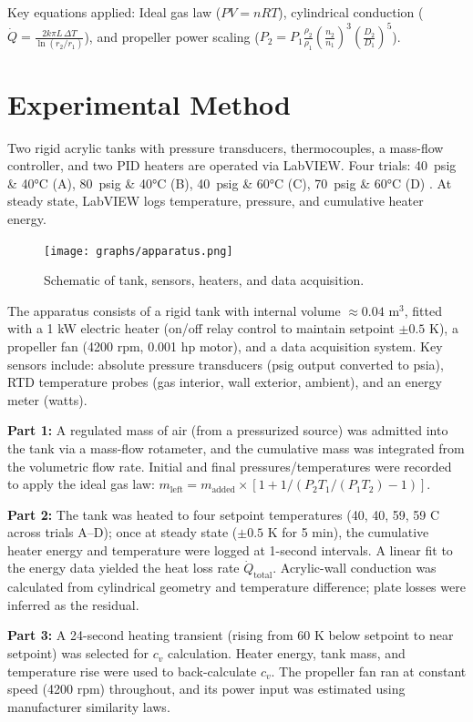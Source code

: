 \documentclass[12pt]{article}
\begin{document}
Key equations applied: Ideal gas law ($PV=nRT$), cylindrical conduction ($\dot{Q}=\frac{2k\pi L\,\Delta T}{\ln(r_2/r_1)}$), and propeller power scaling ($P_2 = P_1 \frac{\rho_2}{\rho_1} \left(\frac{n_2}{n_1}\right)^3 \left(\frac{D_2}{D_1}\right)^5$).

\section*{Experimental Method}
Two rigid acrylic tanks with pressure transducers, thermocouples, a mass-flow controller, and two PID heaters are operated via LabVIEW. Four trials: 40~psig \& 40\si{\celsius} (A), 80~psig \& 40\si{\celsius} (B), 40~psig \& 60\si{\celsius} (C), 70~psig \& 60\si{\celsius} (D) \cite{che260_manual}. At steady state, LabVIEW logs temperature, pressure, and cumulative heater energy.

\begin{figure}[H]
    \centering
    \texttt{[image: graphs/apparatus.png]}
    \caption{Schematic of tank, sensors, heaters, and data acquisition.}
    \label{fig:apparatus}
\end{figure}

The apparatus consists of a rigid tank with internal volume $\approx 0.04$ m$^3$, fitted with a 1 kW electric heater (on/off relay control to maintain setpoint $\pm 0.5$ K), a propeller fan (4200 rpm, 0.001 hp motor), and a data acquisition system. Key sensors include: absolute pressure transducers (psig output converted to psia), RTD temperature probes (gas interior, wall exterior, ambient), and an energy meter (watts). 

\textbf{Part 1:} A regulated mass of air (from a pressurized source) was admitted into the tank via a mass-flow rotameter, and the cumulative mass was integrated from the volumetric flow rate. Initial and final pressures/temperatures were recorded to apply the ideal gas law: $m_{\text{left}} = m_{\text{added}} \times [1 + 1/(P_2 T_1 / (P_1 T_2) - 1)]$.

\textbf{Part 2:} The tank was heated to four setpoint temperatures (40, 40, 59, 59 \textdegree C across trials A–D); once at steady state ($\pm 0.5$ K for 5 min), the cumulative heater energy and temperature were logged at 1-second intervals. A linear fit to the energy data yielded the heat loss rate $\dot{Q}_{\text{total}}$. Acrylic-wall conduction was calculated from cylindrical geometry and temperature difference; plate losses were inferred as the residual.

\textbf{Part 3:} A 24-second heating transient (rising from 60 K below setpoint to near setpoint) was selected for $c_v$ calculation. Heater energy, tank mass, and temperature rise were used to back-calculate $c_v$. The propeller fan ran at constant speed (4200 rpm) throughout, and its power input was estimated using manufacturer similarity laws.
\end{document}

